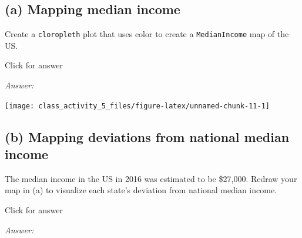 \documentclass[
]{book}
\newenvironment{Shaded}{\begin{snugshade}}{\end{snugshade}}
\newcommand{\AttributeTok}[1]{\textcolor[rgb]{0.13,0.29,0.53}{#1}}
\newcommand{\CommentTok}[1]{\textcolor[rgb]{0.56,0.35,0.01}{\textit{#1}}}
\newcommand{\DecValTok}[1]{\textcolor[rgb]{0.00,0.00,0.81}{#1}}
\newcommand{\FunctionTok}[1]{\textcolor[rgb]{0.13,0.29,0.53}{\textbf{#1}}}
\newcommand{\NormalTok}[1]{#1}
\newcommand{\SpecialCharTok}[1]{\textcolor[rgb]{0.81,0.36,0.00}{\textbf{#1}}}
\newcommand{\StringTok}[1]{\textcolor[rgb]{0.31,0.60,0.02}{#1}}
\begin{document}
\hypertarget{a-mapping-median-income}{%
\subsection{(a) Mapping median income}\label{a-mapping-median-income}}

Create a \texttt{cloropleth} plot that uses color to create a \texttt{MedianIncome} map of the US.

Click for answer

\emph{Answer:}

\begin{Shaded}
\end{Shaded}

\texttt{[image: class\_activity\_5\_files/figure-latex/unnamed-chunk-11-1]}

\hypertarget{b-mapping-deviations-from-national-median-income}{%
\subsection{(b) Mapping deviations from national median income}\label{b-mapping-deviations-from-national-median-income}}

The median income in the US in 2016 was estimated to be \$27,000. Redraw your map in (a) to visualize each state's deviation from national median income.

Click for answer

\emph{Answer:}

\begin{Shaded}
\end{Shaded}
\end{document}

